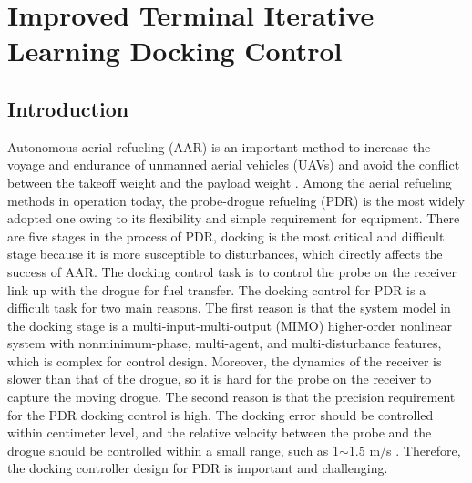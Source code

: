 
\chapter{Improved Terminal Iterative Learning Docking Control}

\section{Introduction}

\label{Introduction}

Autonomous aerial refueling (AAR) is an important method to increase the
voyage and endurance of unmanned aerial vehicles (UAVs) and avoid the conflict
between the takeoff weight and the payload weight
\cite{thomas2014advances,nalepka2005automated}. Among the aerial refueling
methods in operation today, the probe-drogue refueling (PDR)
\cite{bhandari2013bow} is the most widely adopted one owing to its flexibility
and simple requirement for equipment. There are five stages in the process of
PDR, docking is the most critical and difficult stage because it is more
susceptible to disturbances, which directly affects the success of AAR. The
docking control task is to control the probe on the receiver link up with the
drogue for fuel transfer. The docking control for PDR is a difficult task for
two main reasons. The first reason is that the system model in the docking
stage is a multi-input-multi-output (MIMO) higher-order nonlinear system with
nonminimum-phase, multi-agent, and multi-disturbance features, which is
complex for control design. Moreover, the dynamics of the receiver is slower
than that of the drogue, so it is hard for the probe on the receiver to
capture the moving drogue. The second reason is that the precision requirement
for the PDR docking control is high. The docking error should be controlled
within centimeter level, and the relative velocity between the probe and the
drogue should be controlled within a small range, such as 1$\sim$1.5 m/s
\cite{NATO-2004-3}. Therefore, the docking controller design for PDR is
important and challenging.

